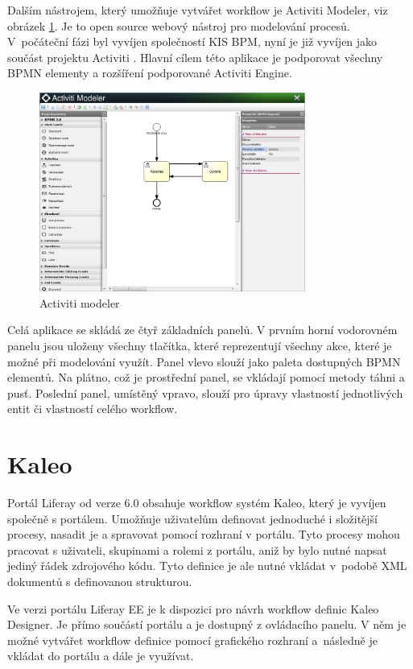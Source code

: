 \documentclass{fithesis}
\begin{document}
Dalším nástrojem, který umožňuje vytvářet workflow je  Activiti Modeler, viz obrázek  \ref{fig:activiti_modeler}. Je to open source webový nástroj pro modelování procesů. V~počáteční fázi byl vyvíjen společností KIS BPM, nyní je již vyvíjen jako součást projektu Activiti \cite{activiti}. Hlavní cílem této aplikace je podporovat všechny BPMN elementy a rozšíření podporované Activiti Engine. 

\begin{figure}[htp]
\centering
\includegraphics[width=330px]{images/activiti_modeler.png}
\caption{Activiti modeler}
\label{fig:activiti_modeler}
\end{figure}

Celá aplikace se skládá ze čtyř základních panelů. V prvním horní vodorovném panelu jsou uloženy všechny tlačítka, které reprezentují všechny akce, které je možné při modelování využít. Panel vlevo slouží jako paleta dostupných BPMN elementů. Na plátno, což je prostřední panel, se vkládají pomocí metody táhni a pusť. Poslední panel, umístěný vpravo, slouží pro úpravy vlastností jednotlivých entit či vlastností celého workflow.

\section{Kaleo}
Portál Liferay od verze 6.0 obsahuje workflow systém Kaleo, který je vyvíjen společně s portálem. Umožňuje uživatelům definovat jednoduché i složitější procesy, nasadit je a spravovat pomocí rozhraní v portálu. Tyto procesy mohou pracovat s uživateli, skupinami a rolemi z portálu, aniž by bylo nutné napsat jediný řádek zdrojového kódu. Tyto definice je ale nutné vkládat v~podobě XML dokumentů s definovanou strukturou. 

Ve verzi portálu Liferay EE je k dispozici pro návrh workflow definic Kaleo Designer. Je přímo součástí portálu a je dostupný z ovládacího panelu. V něm je možné vytvářet workflow definice pomocí grafického rozhraní a~následně je vkládat do portálu a dále je využívat.
\end{document}
